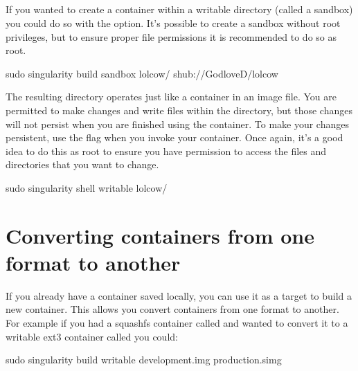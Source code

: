 \documentclass[letterpaper,10pt,english]{sphinxmanual}
\begin{document}
\subsection{}
\label{\detokenize{build_a_container:sandbox}}
If you wanted to create a container within a writable directory (called
a sandbox) you could do so with the  option. It’s possible to create a
sandbox without root privileges, but to ensure proper file permissions
it is recommended to do so as root.

%
\begin{sphinxVerbatim}[commandchars=\\\{\}]
\PYGZdl{} sudo singularity build \PYGZhy{}\PYGZhy{}sandbox lolcow/ shub://GodloveD/lolcow
\end{sphinxVerbatim}

The resulting directory operates just like a container in an image
file. You are permitted to make changes and write files within the
directory, but those changes will not persist when you are finished
using the container. To make your changes persistent, use the  flag
when you invoke your container.
Once again, it’s a good idea to do this as root to ensure you have
permission to access the files and directories that you want to
change.

%
\begin{sphinxVerbatim}[commandchars=\\\{\}]
\PYGZdl{} sudo singularity shell \PYGZhy{}\PYGZhy{}writable lolcow/
\end{sphinxVerbatim}


\section{Converting containers from one format to another}
\label{\detokenize{build_a_container:converting-containers-from-one-format-to-another}}
If you already have a container saved locally, you can use it as a
target to build a new container. This allows you convert containers from
one format to another. For example if you had a squashfs container
called  and wanted to convert it to a writable ext3 container called  you
could:

%
\begin{sphinxVerbatim}[commandchars=\\\{\}]
\PYGZdl{} sudo singularity build \PYGZhy{}\PYGZhy{}writable development.img production.simg
\end{sphinxVerbatim}
\end{document}
